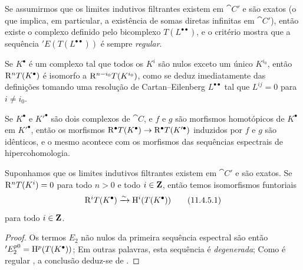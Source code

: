 \begin{env}[11.4.3]
Se assumirmos que os limites indutivos filtrantes existem em $\cat{C}'$ e são exatos (o que implica, em particular, a existência de somas diretas infinitas em $\cat{C}'$), então existe o complexo definido pelo bicomplexo $T(L^{\bullet\bullet})$, e o critério  mostra que a sequência $'E(T(L^{\bullet\bullet}))$ é sempre \emph{regular}.

Se $K^\bullet$ é um complexo tal que todos os $K^i$ são nulos exceto um único $K^{i_0}$, então
$\mathrm{R}^n T(K^\bullet)$ é isomorfo a $\mathrm{R}^{n-i_0} T(K^{i_0})$, como se deduz imediatamente das definições tomando uma resolução de Cartan--Eilenberg $L^{\bullet\bullet}$ tal que $L^{ij}=0$ para $i\neq i_0$.

Se $K^\bullet$ e $K'^\bullet$ são dois complexos de $\cat{C}$, e $f$ e $g$ são morfismos homotópicos de $K^\bullet$ em $K'^\bullet$, então os morfismos $\mathrm{R}^\bullet T(K^\bullet) \rightarrow \mathrm{R}^\bullet T(K'^\bullet)$ induzidos por $f$ e $g$ são idênticos, e o mesmo acontece com os morfismos das sequências espectrais de hipercohomologia.
\end{env}

\begin{proposition}[11.4.5]
\label{0.11.4.5}
Suponhamos que os limites indutivos filtrantes existem em $\cat{C}'$ e são exatos.
Se $\mathrm{R}^n T(K^i) = 0$ para todo $n>0$ e todo $i\in\mathbf{Z}$, então temos isomorfismos funtoriais
\[
\label{0.11.4.5.1}
  \RR^i T(K^\bullet) \simto \HH^i(T(K^\bullet))
\tag{11.4.5.1}
\]
para todo $i\in\mathbf{Z}$.
\end{proposition}

\begin{proof}
Os termos $E_2$ não nulos da primeira sequência espectral  são então $'E_2^{p0} = \mathrm{H}^p(T(K^\bullet))$;
Em outras palavras, esta sequência é \emph{degenerada};
Como é regular , a conclusão deduz-se de .
\end{proof}

